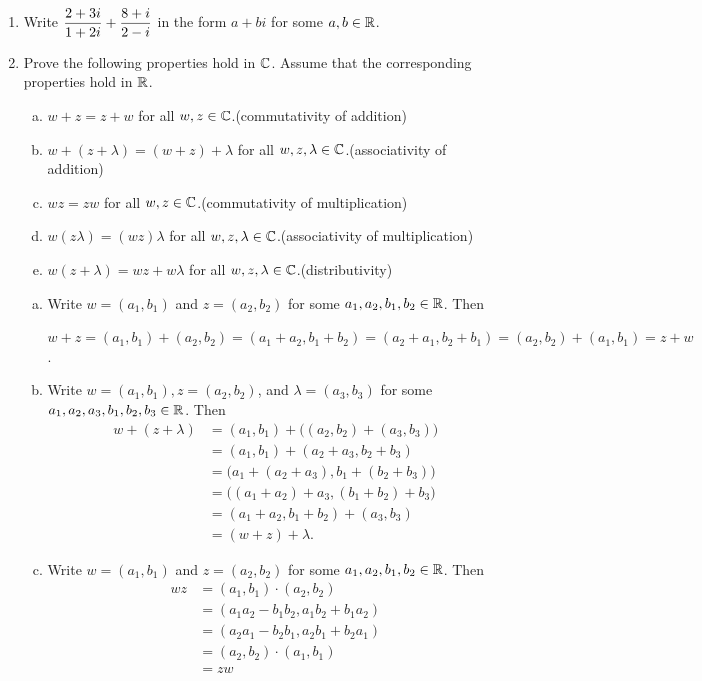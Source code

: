 \documentclass[11pt,fleqn,dvipsnames,usenames]{article}
\begin{document}
\begin{enumerate}
\item Write $\displaystyle{\frac{2 + 3i}{1 + 2i} + \frac{8+i}{2-i}}$ in the form $a+bi$ for some $a,b\in\mathbb{R}$.
\item Prove the following properties hold in $\mathbb{C}$.  Assume that the corresponding properties hold in $\mathbb{R}$.
\begin{enumerate}[(a)]
\item $w + z = z + w$ for all $w,z\in\mathbb{C}$.\hfill (commutativity of addition)
\item $w + (z + \lambda) = (w + z) + \lambda$ for all $w,z,\lambda\in\mathbb{C}$.\hfill (associativity of addition)
\item $wz = zw$ for all $w,z\in\mathbb{C}$.\hfill (commutativity of multiplication)
\item $w(z\lambda) = (wz)\lambda$ for all $w,z,\lambda\in\mathbb{C}$.\hfill (associativity of multiplication)
\item $w(z + \lambda) = wz + w\lambda$ for all $w,z,\lambda\in\mathbb{C}$.\hfill (distributivity)
\end{enumerate}
\vsmsp

\solution 
\begin{enumerate}[(a)]
\item Write $w = (a_{1},b_{1})$ and $z = (a_{2},b_{2})$ for some $a_{1},a_{2},b_{1},b_{2}\in\mathbb{R}$.  Then
\begin{center}
$w + z = (a_{1},b_{1}) + (a_{2},b_{2}) = (a_{1} + a_{2}, b_{1} + b_{2}) = (a_{2} + a_{1}, b_{2} + b_{1}) = (a_{2},b_{2}) + (a_{1},b_{1}) = z + w$.
\end{center}

\item Write $w = (a_{1},b_{1}), z = (a_{2},b_{2})$, and $\lambda = (a_{3},b_{3})$ for some $a_{1},a_{2},a_{3},b_{1},b_{2},b_{3}\in\mathbb{R}$.  Then
\begin{align*}
w + (z + \lambda) &= (a_{1},b_{1}) + \big((a_{2},b_{2}) + (a_{3},b_{3})\big)\\
&= (a_{1},b_{1}) + (a_{2} + a_{3},b_{2}+b_{3})\\
&= \big(a_{1} + (a_{2} + a_{3}), b_{1} + (b_{2}+b_{3})\big)\\
&= \big((a_{1} + a_{2}) + a_{3}, (b_{1} + b_{2})+b_{3}\big)\\
&= (a_{1} + a_{2}, b_{1} + b_{2}) + (a_{3},b_{3})\\
&= (w + z) + \lambda.
\end{align*}

\item Write $w = (a_{1},b_{1})$ and $z = (a_{2},b_{2})$ for some $a_{1},a_{2},b_{1},b_{2}\in\mathbb{R}$.  Then
\begin{align*}
wz &= (a_{1},b_{1})\cdot (a_{2},b_{2})\\
&= (a_{1}a_{2} - b_{1}b_{2},a_{1}b_{2} + b_{1}a_{2})\\
&= (a_{2}a_{1} - b_{2}b_{1},a_{2}b_{1} + b_{2}a_{1})\\
&= (a_{2},b_{2})\cdot (a_{1},b_{1})\\
&= zw
\end{align*}


\end{enumerate}
\end{enumerate}
\end{document}
